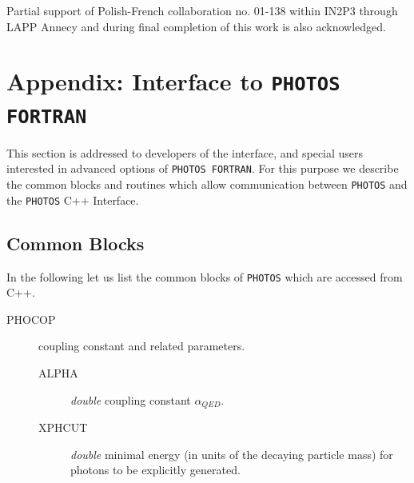 \documentclass[]{Photos_interface_design}
\begin{document}
Partial support of Polish-French collaboration
no. 01-138 within IN2P3 through LAPP Annecy and 
during final completion of this work is
also acknowledged.

\newpage

{}
% 






\newpage
\appendix

\section{Appendix: Interface to {\tt PHOTOS FORTRAN}}
\label{Interface to PHOTOS}

This section is addressed to developers of the interface, 
and special users interested in advanced options of {\tt PHOTOS FORTRAN}.
For this purpose we describe the common blocks and routines which allow
communication between {\tt PHOTOS} and the {\tt PHOTOS} C++ Interface.

\subsection{Common Blocks}

In the following let us list the common blocks of {\tt PHOTOS} which are accessed
from C++.

\begin{description}
\item[PHOCOP] coupling constant and related parameters.
    \begin{description}
	\item[ALPHA]  \textit{double} coupling constant $\alpha_{QED}$.
	\item[XPHCUT] \textit{double} minimal energy (in units of the decaying particle mass) for photons to be explicitly generated.
    \end{description}
\end{description}
\end{document}
